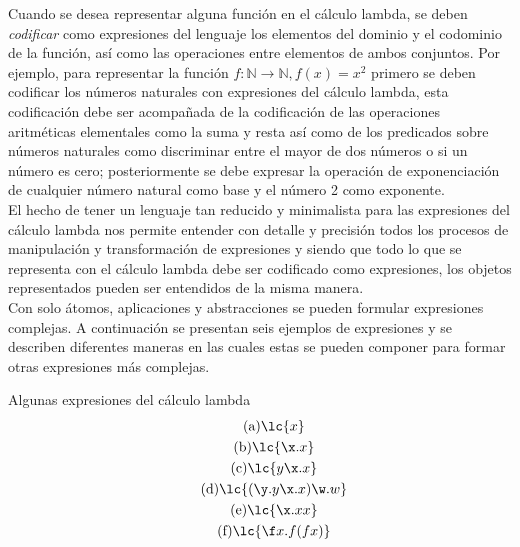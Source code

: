 Cuando se desea representar alguna función en el cálculo lambda, se deben
\emph{codificar} como expresiones del lenguaje los elementos del dominio y el
codominio de la función, así como las operaciones entre elementos de ambos
conjuntos. Por ejemplo, para representar la función \(f : \mathbb{N} \to
\mathbb{N}, f(x)=x^{2}\) primero se deben codificar los números naturales con
expresiones del cálculo lambda, esta codificación debe ser acompañada de la
codificación de las operaciones aritméticas elementales como la suma y resta así
como de los predicados sobre números naturales como discriminar entre el mayor
de dos números o si un número es cero; posteriormente se debe expresar la
operación de exponenciación de cualquier número natural como base y el número 2
como exponente. \\

El hecho de tener un lenguaje tan reducido y minimalista para las expresiones
del cálculo lambda nos permite entender con detalle y precisión todos los
procesos de manipulación y transformación de expresiones y siendo que todo lo
que se representa con el cálculo lambda debe ser codificado como expresiones,
los objetos representados pueden ser entendidos de la misma manera. \\

Con solo átomos, aplicaciones y abstracciones se pueden formular expresiones
complejas. A continuación se presentan seis ejemplos de expresiones y se
describen diferentes maneras en las cuales estas se pueden componer para formar
otras expresiones más complejas. \\

\begin{ejemplo} Algunas expresiones del cálculo lambda
  \label{ejemplo:expresiones1}
  \begin{subequations}
    \begin{gather}
      \label{ejemplo:expresiones1:a} \tag{a}
      \lc{x}
      \\
      \label{ejemplo:expresiones1:b} \tag{b}
      \lc{\x.x}
      \\
      \label{ejemplo:expresiones1:c} \tag{c}
      \lc{y\x.x}
      \\
      \label{ejemplo:expresiones1:d} \tag{d}
      \lc{(\y.y\x.x)\w.w}
      \\
      \label{ejemplo:expresiones1:e} \tag{e}
      \lc{\x.x x}
      \\
      \label{ejemplo:expresiones1:f} \tag{f}
      \lc{\f x.f(f x)}
    \end{gather}
  \end{subequations}
\end{ejemplo} \

